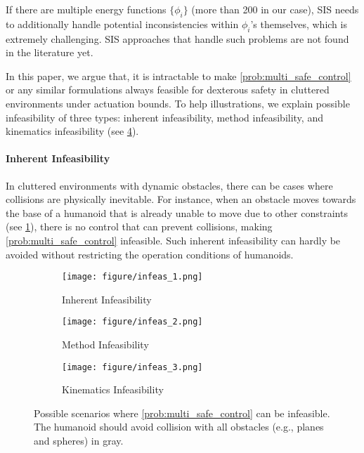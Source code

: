If there are multiple energy functions $\{\phi_i\}$ (more than 200 in our case), SIS needs to additionally handle potential inconsistencies within $\phi_i$'s themselves, which is extremely challenging.
SIS approaches that handle such problems are not found in the literature yet.

In this paper, we argue that, it is intractable to make \eqref{prob:multi_safe_control} or any similar formulations always feasible for dexterous safety in cluttered environments under actuation bounds.
To help illustrations, we explain possible infeasibility of three types: inherent infeasibility, method infeasibility, and kinematics infeasibility (see \cref{fig:infeas_analysis}).

\paragraph{Inherent Infeasibility}
In cluttered environments with dynamic obstacles, there can be cases where collisions are physically inevitable.
For instance, when an obstacle moves towards the base of a humanoid that is already unable to move due to other constraints (see \cref{fig:infeas_1}), there is no control that can prevent collisions, making \eqref{prob:multi_safe_control} infeasible.
Such inherent infeasibility can hardly be avoided without restricting the operation conditions of humanoids.



\begin{figure}[htbp]
    \centering
    \begin{subfigure}[b]{0.3\linewidth}
        \centering
        \texttt{[image: figure/infeas\_1.png]}
        \caption{Inherent Infeasibility}
        \label{fig:infeas_1}
    \end{subfigure}
    \hfill
    \begin{subfigure}[b]{0.3\linewidth}
        \centering
        \texttt{[image: figure/infeas\_2.png]}
        \caption{Method Infeasibility}
        \label{fig:infeas_2}
    \end{subfigure}
    \hfill
    \begin{subfigure}[b]{0.32\linewidth}
        \centering
        \texttt{[image: figure/infeas\_3.png]}
        \caption{Kinematics Infeasibility}
        \label{fig:infeas_3}
    \end{subfigure}
    \caption{Possible scenarios where \eqref{prob:multi_safe_control} can be infeasible. The humanoid should avoid collision with all obstacles (e.g., planes and spheres) in gray.}
    \label{fig:infeas_analysis}
\end{figure}

